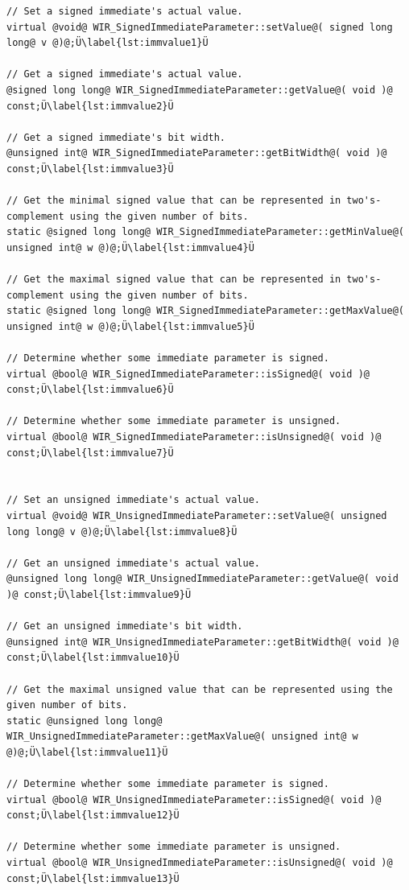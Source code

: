 \begin{lstlisting}[style=code,float=t,caption={Value Handling of Signed and Unsigned Immediates},label=lst:immvalue]
// Set a signed immediate's actual value.
virtual @void@ WIR_SignedImmediateParameter::setValue@( signed long long@ v @)@;Ü\label{lst:immvalue1}Ü

// Get a signed immediate's actual value.
@signed long long@ WIR_SignedImmediateParameter::getValue@( void )@ const;Ü\label{lst:immvalue2}Ü

// Get a signed immediate's bit width.
@unsigned int@ WIR_SignedImmediateParameter::getBitWidth@( void )@ const;Ü\label{lst:immvalue3}Ü

// Get the minimal signed value that can be represented in two's-complement using the given number of bits.
static @signed long long@ WIR_SignedImmediateParameter::getMinValue@( unsigned int@ w @)@;Ü\label{lst:immvalue4}Ü

// Get the maximal signed value that can be represented in two's-complement using the given number of bits.
static @signed long long@ WIR_SignedImmediateParameter::getMaxValue@( unsigned int@ w @)@;Ü\label{lst:immvalue5}Ü

// Determine whether some immediate parameter is signed.
virtual @bool@ WIR_SignedImmediateParameter::isSigned@( void )@ const;Ü\label{lst:immvalue6}Ü

// Determine whether some immediate parameter is unsigned.
virtual @bool@ WIR_SignedImmediateParameter::isUnsigned@( void )@ const;Ü\label{lst:immvalue7}Ü


// Set an unsigned immediate's actual value.
virtual @void@ WIR_UnsignedImmediateParameter::setValue@( unsigned long long@ v @)@;Ü\label{lst:immvalue8}Ü

// Get an unsigned immediate's actual value.
@unsigned long long@ WIR_UnsignedImmediateParameter::getValue@( void )@ const;Ü\label{lst:immvalue9}Ü

// Get an unsigned immediate's bit width.
@unsigned int@ WIR_UnsignedImmediateParameter::getBitWidth@( void )@ const;Ü\label{lst:immvalue10}Ü

// Get the maximal unsigned value that can be represented using the given number of bits.
static @unsigned long long@ WIR_UnsignedImmediateParameter::getMaxValue@( unsigned int@ w @)@;Ü\label{lst:immvalue11}Ü

// Determine whether some immediate parameter is signed.
virtual @bool@ WIR_UnsignedImmediateParameter::isSigned@( void )@ const;Ü\label{lst:immvalue12}Ü

// Determine whether some immediate parameter is unsigned.
virtual @bool@ WIR_UnsignedImmediateParameter::isUnsigned@( void )@ const;Ü\label{lst:immvalue13}Ü
\end{lstlisting}

